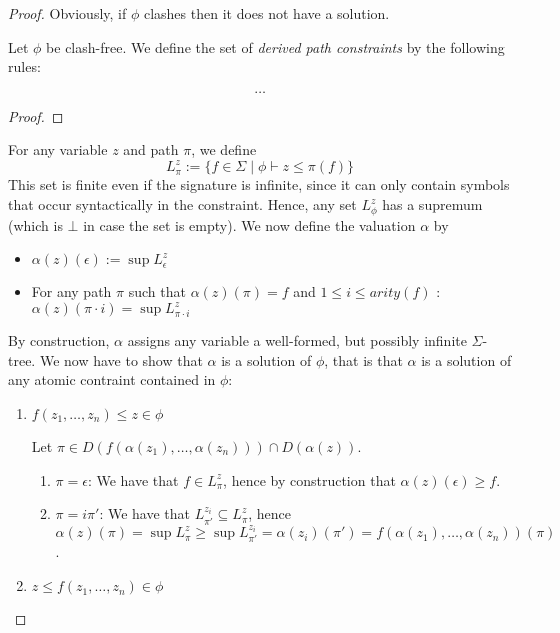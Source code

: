 \begin{proof}
  Obviously, if $\phi$ clashes then it does not have a solution.
  
  Let $\phi$ be clash-free. We define the set of \emph{derived path
    constraints} by the following rules:

\[\ldots \]

\begin{proof}

\end{proof}

For any variable $z$ and path $\pi$, we define 
\[
L^z_\pi  := \{f \in \Sigma \mid \phi \vdash z \leq \pi(f) \}
\]
This set is finite even if the signature is infinite, since it can
only contain symbols that occur syntactically in the constraint.
Hence, any set $L^z_\phi$ has a supremum (which is $\bot$ in case the
set is empty).  We now define the valuation $\alpha$ by
\begin{itemize}
\item $ \alpha(z)(\epsilon) := \sup L^z_\epsilon$
\item For any path $\pi$ such that $\alpha(z)(\pi)=f$ and $1 \leq i
  \leq arity(f)$ :\\ $\alpha(z)(\pi\cdot i) = \sup L^z_{\pi\cdot i}$
\end{itemize}
By construction, $\alpha$ assigns any variable a well-formed, but
possibly infinite $\Sigma$-tree. We now have to show that $\alpha$ is
a solution of $\phi$, that is that $\alpha$ is a solution of any
atomic contraint contained in $\phi$:
\begin{enumerate}
\item $f(z_1,\ldots,z_n) \leq z \in \phi$

Let $\pi \in D(f(\alpha(z_1),\ldots,\alpha(z_n))) \cap
D(\alpha(z))$.

\begin{enumerate}

\item $\pi=\epsilon$:
We have that $f\in L^z_\pi$, hence by construction that
$\alpha(z)(\epsilon) \geq f$.

\item $\pi = i\pi'$:
We have that $L^{z_i}_{\pi'} \subseteq L^z_{\pi}$, hence
$\alpha(z)(\pi) = \sup L^z_{\pi} \geq \sup L^{z_i}_{\pi'} =
\alpha(z_i)(\pi') = f(\alpha(z_1),\ldots,\alpha(z_n))(\pi)$.

\end{enumerate}

\item $z \leq f(z_1,\ldots,z_n) \in \phi$


\end{enumerate}
\end{proof}
